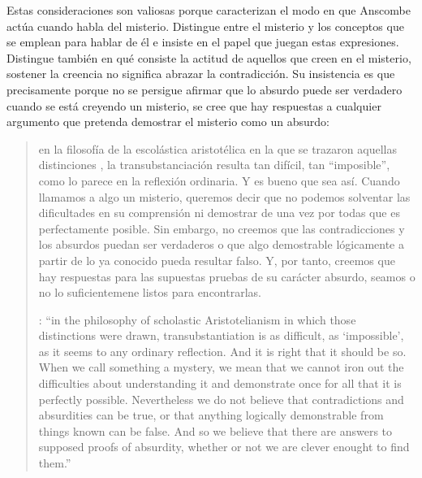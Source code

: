 Estas consideraciones son valiosas porque caracterizan el modo en que Anscombe actúa cuando habla del misterio. Distingue entre el misterio y los conceptos que se emplean para hablar de él e insiste en el papel que juegan estas expresiones. Distingue también en qué consiste la actitud de aquellos que creen en el misterio, sostener la creencia no significa abrazar la contradicción. Su insistencia es que precisamente porque no se persigue afirmar que lo absurdo puede ser verdadero cuando se está creyendo un misterio, se cree que hay respuestas a cualquier argumento que pretenda demostrar el misterio como un absurdo: \blockquote[{\cite[109]{anscombe1981erp:ot}}: \enquote{in the philosophy of scholastic Aristotelianism in which those distinctions  were drawn, transubstantiation is as difficult, as `impossible', as it seems to any ordinary reflection. And it is right that it should be so. When we call something a mystery, we mean that we cannot iron out the difficulties about understanding it and demonstrate once for all that it is perfectly possible. Nevertheless we do not believe that contradictions and absurdities can be true, or that anything logically demonstrable from things known can be false. And so we believe that there are answers to supposed proofs of absurdity, whether or not we are clever enought to find them.}]{en la filosofía de la escolástica aristotélica en la que se trazaron aquellas distinciones , la transubstanciación resulta tan difícil, tan ``imposible'', como lo parece en la reflexión ordinaria. Y es bueno que sea así. Cuando llamamos a algo un misterio, queremos decir que no podemos solventar las dificultades en su comprensión ni demostrar de una vez por todas que es perfectamente posible. Sin embargo, no creemos que las contradicciones y los absurdos puedan ser verdaderos o que algo demostrable lógicamente a partir de lo ya conocido pueda resultar falso. Y, por tanto, creemos que hay respuestas para las supuestas pruebas de su carácter absurdo, seamos o no lo suficientemene listos para encontrarlas.}

